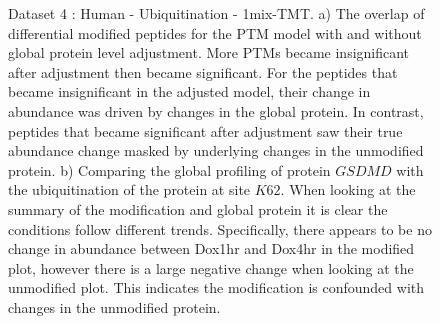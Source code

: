 \documentclass[mcp]{article}
\numberwithin{table}{section}
\begin{document}
\begin{figure}[ht]
\caption{Dataset 4 : Human - Ubiquitination - 1mix-TMT. a) The overlap of differential modified peptides for the PTM model with and without global protein level adjustment. More PTMs became insignificant after adjustment then became significant. For the peptides that became insignificant in the adjusted model, their change in abundance was driven by changes in the global protein. In contrast, peptides that became significant after adjustment saw their true abundance change masked by underlying changes in the unmodified protein. b) Comparing the global profiling of protein $GSDMD$ with the ubiquitination of the protein at site $K62$. When looking at the summary of the modification and global protein it is clear the conditions follow different trends. Specifically, there appears to be no change in abundance between Dox1hr and Dox4hr in the modified plot, however there is a large negative change when looking at the unmodified plot. This indicates the modification is confounded with changes in the unmodified protein.}
\label{fig:data4_plots}
\end{figure}
\end{document}
